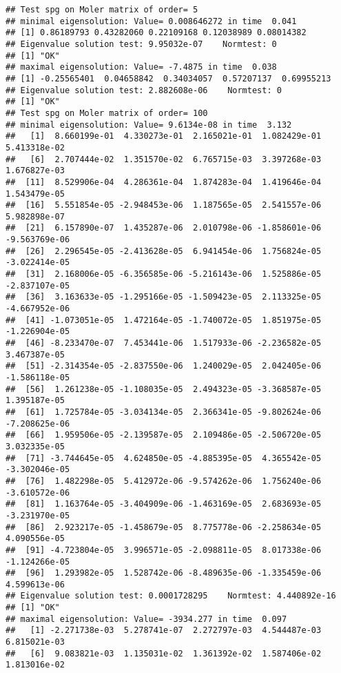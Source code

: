 \documentclass[11pt]{article}\usepackage[]{graphicx}\usepackage[]{color}
\makeatletter
\newenvironment{kframe}{%
 \def\at@end@of@kframe{}%
 \ifinner\ifhmode%
  \def\at@end@of@kframe{\end{minipage}}%
  \begin{minipage}{\columnwidth}%
 \fi\fi%
 \def\FrameCommand##1{\hskip\@totalleftmargin \hskip-\fboxsep
 \colorbox{shadecolor}{##1}\hskip-\fboxsep
     \hskip-\linewidth \hskip-\@totalleftmargin \hskip\columnwidth}%
 \MakeFramed {\advance\hsize-\width
   \@totalleftmargin\z@ \linewidth\hsize
   \@setminipage}}%
 {\par\unskip\endMakeFramed%
 \at@end@of@kframe}
\newenvironment{knitrout}{}{} %
\makeatother
\begin{document}
\begin{knitrout}\scriptsize
{}\color{fgcolor}\begin{kframe}
\begin{verbatim}
## Test spg on Moler matrix of order= 5 
## minimal eigensolution: Value= 0.008646272 in time  0.041 
## [1] 0.86189793 0.43282060 0.22109168 0.12038989 0.08014382
## Eigenvalue solution test: 9.95032e-07    Normtest: 0 
## [1] "OK"
## maximal eigensolution: Value= -7.4875 in time  0.038 
## [1] -0.25565401  0.04658842  0.34034057  0.57207137  0.69955213
## Eigenvalue solution test: 2.882608e-06    Normtest: 0 
## [1] "OK"
## Test spg on Moler matrix of order= 100 
## minimal eigensolution: Value= 9.6134e-08 in time  3.132 
##   [1]  8.660199e-01  4.330273e-01  2.165021e-01  1.082429e-01  5.413318e-02
##   [6]  2.707444e-02  1.351570e-02  6.765715e-03  3.397268e-03  1.676827e-03
##  [11]  8.529906e-04  4.286361e-04  1.874283e-04  1.419646e-04  1.543479e-05
##  [16]  5.551854e-05 -2.948453e-06  1.187565e-05  2.541557e-06  5.982898e-07
##  [21]  6.157890e-07  1.435287e-06  2.010798e-06 -1.858601e-06 -9.563769e-06
##  [26]  2.296545e-05 -2.413628e-05  6.941454e-06  1.756824e-05 -3.022414e-05
##  [31]  2.168006e-05 -6.356585e-06 -5.216143e-06  1.525886e-05 -2.837107e-05
##  [36]  3.163633e-05 -1.295166e-05 -1.509423e-05  2.113325e-05 -4.667952e-06
##  [41] -1.073051e-05  1.472164e-05 -1.740072e-05  1.851975e-05 -1.226904e-05
##  [46] -8.233470e-07  7.453441e-06  1.517933e-06 -2.236582e-05  3.467387e-05
##  [51] -2.314354e-05 -2.837550e-06  1.240029e-05  2.042405e-06 -1.586118e-05
##  [56]  1.261238e-05 -1.108035e-05  2.494323e-05 -3.368587e-05  1.395187e-05
##  [61]  1.725784e-05 -3.034134e-05  2.366341e-05 -9.802624e-06 -7.208625e-06
##  [66]  1.959506e-05 -2.139587e-05  2.109486e-05 -2.506720e-05  3.032335e-05
##  [71] -3.744645e-05  4.624850e-05 -4.885395e-05  4.365542e-05 -3.302046e-05
##  [76]  1.482298e-05  5.412972e-06 -9.574262e-06  1.756240e-06 -3.610572e-06
##  [81]  1.163764e-05 -3.404909e-06 -1.463169e-05  2.683693e-05 -3.231970e-05
##  [86]  2.923217e-05 -1.458679e-05  8.775778e-06 -2.258634e-05  4.090556e-05
##  [91] -4.723804e-05  3.996571e-05 -2.098811e-05  8.017338e-06 -1.124266e-05
##  [96]  1.293982e-05  1.528742e-06 -8.489635e-06 -1.335459e-06  4.599613e-06
## Eigenvalue solution test: 0.0001728295    Normtest: 4.440892e-16 
## [1] "OK"
## maximal eigensolution: Value= -3934.277 in time  0.097 
##   [1] -2.271738e-03  5.278741e-07  2.272797e-03  4.544487e-03  6.815021e-03
##   [6]  9.083821e-03  1.135031e-02  1.361392e-02  1.587406e-02  1.813016e-02

\end{verbatim}
\end{kframe}
\end{knitrout}
\end{document}
